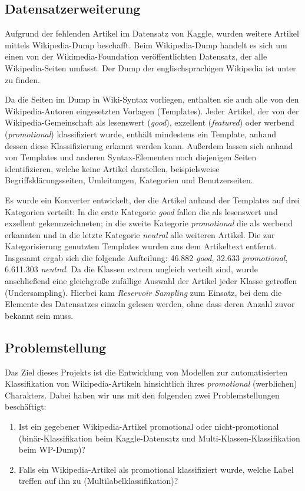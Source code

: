 \subsection{Datensatzerweiterung}

\label{WPDump}
Aufgrund der fehlenden Artikel im Datensatz von Kaggle, wurden weitere Artikel mittels Wikipedia-Dump beschafft. Beim Wikipedia-Dump handelt es sich um einen von der Wikimedia-Foundation veröffentlichten Datensatz, der alle Wikipedia-Seiten umfasst. Der Dump der englischsprachigen Wikipedia ist unter \cite{WpDump2024} zu finden.

Da die Seiten im Dump in Wiki-Syntax vorliegen, enthalten sie auch alle von den Wikipedia-Autoren eingesetzten Vorlagen (Templates). Jeder Artikel, der von der Wiki\-pedia-Gemeinschaft als lesenswert (\emph{good}), exzellent (\emph{featured}) oder werbend (\emph{promotional}) klassifiziert wurde, enthält mindestens ein Template, anhand dessen diese Klassifizierung erkannt werden kann. Außerdem lassen sich anhand von Templates und anderen Syntax-Elementen noch diejenigen Seiten identifizieren, welche keine Artikel darstellen, beispielsweise Begriffsklärungsseiten, Umleitungen, Kategorien und Benutzerseiten.

Es wurde ein Konverter entwickelt, der die Artikel anhand der Templates auf drei Kategorien verteilt: In die erste Kategorie \emph{good} fallen die als lesenswert und exzellent gekennzeichneten; in die zweite Kategorie \emph{promotional} die als werbend erkannten und in die letzte Kategorie \emph{neutral} alle weiteren Artikel. Die zur Kategorisierung genutzten Templates wurden aus dem Artikeltext entfernt. Insgesamt ergab sich die folgende Aufteilung: 46.882 \emph{good}, 32.633 \emph{promotional}, 6.611.303 \emph{neutral}. Da die Klassen extrem ungleich verteilt sind, wurde anschließend eine gleichgroße zufällige Auswahl der Artikel jeder Klasse getroffen (Undersampling). Hierbei kam \textit{Reservoir Sampling} \cite{Vitter1985} zum Einsatz, bei dem die Elemente des Datensatzes einzeln gelesen werden, ohne dass deren Anzahl zuvor bekannt sein muss.

\subsection{Problemstellung}
\label{Problemdefinition}
Das Ziel dieses Projekts ist die Entwicklung von Modellen zur automatisierten Klassifikation von Wikipedia-Artikeln hinsichtlich ihres \textit{promotional} (werblichen) Charakters. Dabei haben wir uns mit den folgenden zwei Problemstellungen beschäftigt:
\begin{enumerate}
    \item Ist ein gegebener Wikipedia-Artikel promotional oder nicht-promotional (binär-Klassifikation beim Kaggle-Datensatz und Multi-Klassen-Klassifikation beim WP-Dump)?

    \item Falls ein Wikipedia-Artikel als promotional klassifiziert wurde, welche Label treffen auf ihn zu (Multilabelklassifikation)?
\end{enumerate}
